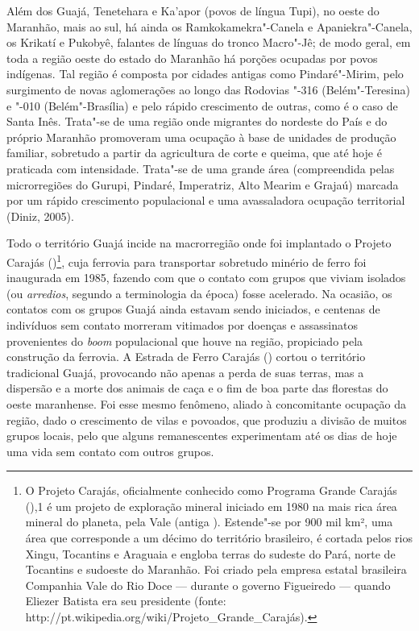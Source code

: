 Além dos Guajá, Tenetehara e Ka'apor (povos de língua Tupi), no oeste do
Maranhão, mais ao sul, há ainda os Ramkokamekra"-Canela e
Apaniekra"-Canela, os Krikatí e Pukobyê, falantes de línguas do tronco
Macro"-Jê; de modo geral, em toda a região oeste do estado do Maranhão há
porções ocupadas por povos indígenas. Tal região é composta por cidades
antigas como Pindaré"-Mirim, pelo surgimento de novas aglomerações ao
longo das Rodovias "-316 (Belém"-Teresina) e "-010 (Belém"-Brasília) e
pelo rápido crescimento de outras, como é o caso de Santa Inês. Trata"-se
de uma região onde migrantes do nordeste do País e do próprio Maranhão
promoveram uma ocupação à base de unidades de produção familiar,
sobretudo a partir da agricultura de corte e queima, que até hoje é
praticada com intensidade. Trata"-se de uma grande área (compreendida
pelas microrregiões do Gurupi, Pindaré, Imperatriz, Alto Mearim e
Grajaú) marcada por um rápido crescimento populacional e uma
avassaladora ocupação territorial (Diniz, 2005).

Todo o território Guajá incide na macrorregião onde foi implantado o
Projeto Carajás ()\footnote{O Projeto Carajás, oficialmente conhecido
  como Programa Grande Carajás (),1 é um projeto de exploração mineral
  iniciado em 1980 na mais rica área mineral do planeta, pela Vale
  (antiga ). Estende"-se por 900 mil km², uma área que corresponde a
  um décimo do território brasileiro, é cortada pelos rios Xingu,
  Tocantins e Araguaia e engloba terras do sudeste do Pará, norte de
  Tocantins e sudoeste do Maranhão. Foi criado pela empresa estatal
  brasileira Companhia Vale do Rio Doce --- durante o governo Figueiredo ---
  quando Eliezer Batista era seu presidente (fonte:
  http://pt.wikipedia.org/wiki/Projeto\_Grande\_Carajás).}, cuja
ferrovia para transportar sobretudo minério de ferro foi inaugurada em
1985, fazendo com que o contato com grupos que viviam isolados (ou
\emph{arredios}, segundo a terminologia da época) fosse acelerado. Na
ocasião, os contatos com os grupos Guajá ainda estavam sendo iniciados,
e centenas de indivíduos sem contato morreram vitimados por doenças e
assassinatos provenientes do \emph{boom} populacional que houve na
região, propiciado pela construção da ferrovia. A Estrada de Ferro
Carajás () cortou o território tradicional Guajá, provocando não
apenas a perda de suas terras, mas a dispersão e a morte dos animais de
caça e o fim de boa parte das florestas do oeste maranhense. Foi esse
mesmo fenômeno, aliado à concomitante ocupação da região, dado o
crescimento de vilas e povoados, que produziu a divisão de muitos grupos
locais, pelo que alguns remanescentes experimentam até os dias de hoje
uma vida sem contato com outros grupos.

